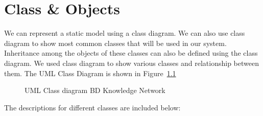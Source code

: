 \documentclass{scrreprt}
\begin{document}
\chapter{Class \& Objects}
We can represent a static model using a class diagram. We can also use class diagram to show most common classes that will be  used in our system. Inheritance among the objects of these classes can also be defined using the class diagram. We used class diagram to show various classes and relationship between them. The UML Class Diagram is shown in Figure~\ref{CD}
\begin{figure}
\begin{center}
\end{center} 
\caption{UML Class diagram BD Knowledge Network\label{CD}}
\end{figure}
The descriptions for different classes are included below: 
\end{document}
